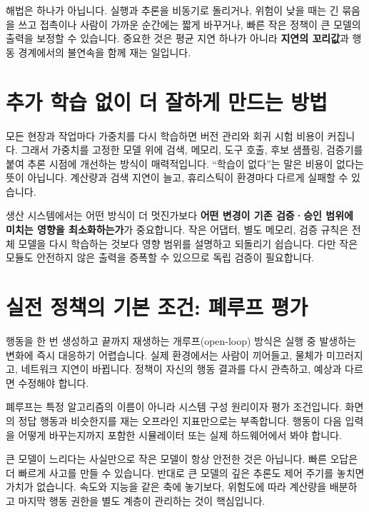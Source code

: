 \documentclass[11pt,openany]{book}
\newcommand{\keyterm}[1]{{\sffamily\bfseries\color{deepblue}#1}}
\begin{document}
해법은 하나가 아닙니다. 실행과 추론을 비동기로 돌리거나, 위험이 낮을 때는 긴 묶음을 쓰고 접촉이나 사람이 가까운 순간에는 짧게 바꾸거나, 빠른 작은 정책이 큰 모델의 출력을 보정할 수 있습니다. 중요한 것은 평균 지연 하나가 아니라 \keyterm{지연의 꼬리값}과 행동 경계에서의 불연속을 함께 재는 일입니다.

\section{추가 학습 없이 더 잘하게 만드는 방법}

모든 현장과 작업마다 가중치를 다시 학습하면 버전 관리와 회귀 시험 비용이 커집니다. 그래서 가중치를 고정한 모델 위에 검색, 메모리, 도구 호출, 후보 샘플링, 검증기를 붙여 추론 시점에 개선하는 방식이 매력적입니다. ``학습이 없다''는 말은 비용이 없다는 뜻이 아닙니다. 계산량과 검색 지연이 늘고, 휴리스틱이 환경마다 다르게 실패할 수 있습니다.

\begin{fieldbox}
생산 시스템에서는 어떤 방식이 더 멋진가보다 \textbf{어떤 변경이 기존 검증·승인 범위에 미치는 영향을 최소화하는가}가 중요합니다. 작은 어댑터, 별도 메모리, 검증 규칙은 전체 모델을 다시 학습하는 것보다 영향 범위를 설명하고 되돌리기 쉽습니다. 다만 작은 모듈도 안전하지 않은 출력을 증폭할 수 있으므로 독립 검증이 필요합니다.
\end{fieldbox}

\section{실전 정책의 기본 조건: 폐루프 평가}

행동을 한 번 생성하고 끝까지 재생하는 개루프(open-loop) 방식은 실행 중 발생하는 변화에 즉시 대응하기 어렵습니다. 실제 환경에서는 사람이 끼어들고, 물체가 미끄러지고, 네트워크 지연이 바뀝니다. 정책이 자신의 행동 결과를 다시 관측하고, 예상과 다르면 수정해야 합니다.

폐루프는 특정 알고리즘의 이름이 아니라 시스템 구성 원리이자 평가 조건입니다. 화면의 정답 행동과 비슷한지를 재는 오프라인 지표만으로는 부족합니다. 행동이 다음 입력을 어떻게 바꾸는지까지 포함한 시뮬레이터 또는 실제 하드웨어에서 봐야 합니다.

\begin{cautionbox}
큰 모델이 느리다는 사실만으로 작은 모델이 항상 안전한 것은 아닙니다. 빠른 오답은 더 빠르게 사고를 만들 수 있습니다. 반대로 큰 모델의 깊은 추론도 제어 주기를 놓치면 가치가 없습니다. 속도와 지능을 같은 축에 놓기보다, 위험도에 따라 계산량을 배분하고 마지막 행동 권한을 별도 계층이 관리하는 것이 핵심입니다.
\end{cautionbox}
\end{document}
